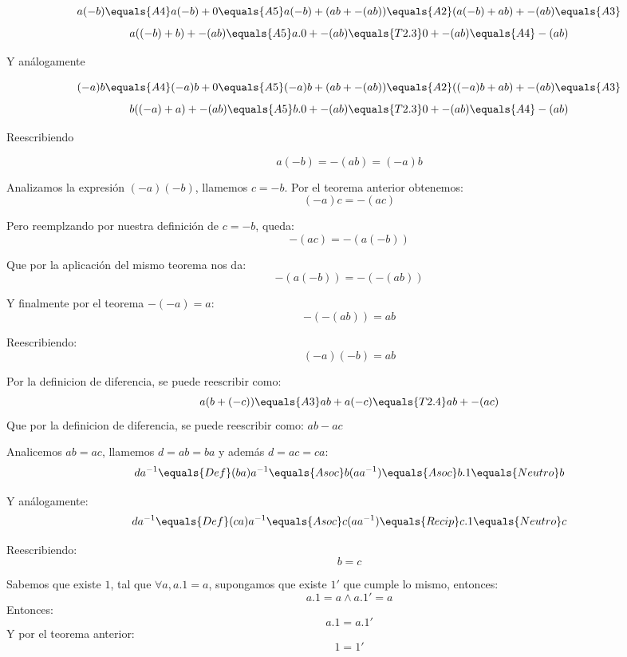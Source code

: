 \documentclass[10pt]{article}
\begin{document}
\begin{prf}[$a(-b)=-(ab)=(-a)b$]{}
	$$
	a(-b) \equals{A4}
	a(-b)+0 \equals{A5}
	a(-b)+(ab+-(ab)) \equals{A2}
	(a(-b)+ab)+-(ab) \equals{A3}$$$$
	a((-b)+b)+-(ab) \equals{A5}
	a.0+-(ab) \equals{T2.3}
	0+-(ab) \equals{A4}
	-(ab)
	$$

	Y análogamente

	$$
	(-a)b \equals{A4}
	(-a)b+0 \equals{A5}
	(-a)b+(ab+-(ab)) \equals{A2}
	((-a)b+ab)+-(ab) \equals{A3}$$$$
	b((-a)+a)+-(ab) \equals{A5}
	b.0+-(ab) \equals{T2.3}
	0+-(ab) \equals{A4}
	-(ab)
	$$

	Reescribiendo

	$$a(-b)=-(ab)=(-a)b$$
\end{prf}

\begin{prf}[$(-a)(-b)=ab$]{}
	Analizamos la expresión $(-a)(-b)$, llamemos $c = -b$.
	Por el teorema anterior obtenemos:
	$$(-a)c = -(ac)$$

	Pero reemplzando por nuestra definición de $c = -b$, queda:
	$$-(ac) = -(a(-b))$$

	Que por la aplicación del mismo teorema nos da:
	$$-(a(-b)) = -(-(ab))$$

	Y finalmente por el teorema $-(-a) = a$:
	$$-(-(ab)) = ab$$

	Reescribiendo:
	$$(-a)(-b) = ab$$

\end{prf}

\begin{prf}[$a(b-c)=ab-ac$]{}
	Por la definicion de diferencia, se puede reescribir como:
	$$
	a(b+(-c)) \equals{A3}
	ab+a(-c) \equals{T2.4}
	ab+-(ac)
	$$
	Que por la definicion de diferencia, se puede reescribir como: $ab-ac$
\end{prf}

\begin{prf}{}
	Analicemos $ab = ac$, llamemos $d = ab = ba$ y además $d = ac = ca$:
	$$
	da^{-1} \equals{Def}
	(ba)a^{-1} \equals{Asoc}
	b(aa^{-1}) \equals{Asoc}
	b.1 \equals{Neutro}
	b
	$$

	Y análogamente:
	$$
	da^{-1} \equals{Def}
	(ca)a^{-1} \equals{Asoc}
	c(aa^{-1}) \equals{Recip}
	c.1 \equals{Neutro}
	c
	$$

	Reescribiendo:
	$$b = c$$
\end{prf}

\begin{prf}{}
	Sabemos que existe $1$, tal que $\forall a, a.1 = a$, supongamos que existe $1'$ que cumple lo mismo, entonces:
	$$a.1 = a \land a.1' = a$$
	Entonces:
	$$a.1 = a.1'$$
	Y por el teorema anterior:
	$$1 = 1'$$
\end{prf}
\end{document}
